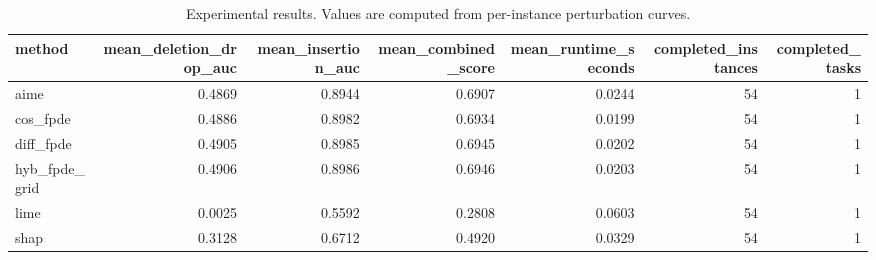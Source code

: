 \begin{table}[t]
\caption{Experimental results. Values are computed from per-instance perturbation curves.}
\label{tab:main_results_computed}
\centering
\begin{tabular}{lrrrrrr}
\toprule
method & mean\_deletion\_drop\_auc & mean\_insertion\_auc & mean\_combined\_score & mean\_runtime\_seconds & completed\_instances & completed\_tasks \\
\midrule
aime & 0.4869 & 0.8944 & 0.6907 & 0.0244 & 54 & 1 \\
cos\_fpde & 0.4886 & 0.8982 & 0.6934 & 0.0199 & 54 & 1 \\
diff\_fpde & 0.4905 & 0.8985 & 0.6945 & 0.0202 & 54 & 1 \\
hyb\_fpde\_grid & 0.4906 & 0.8986 & 0.6946 & 0.0203 & 54 & 1 \\
lime & 0.0025 & 0.5592 & 0.2808 & 0.0603 & 54 & 1 \\
shap & 0.3128 & 0.6712 & 0.4920 & 0.0329 & 54 & 1 \\
\bottomrule
\end{tabular}

\end{table}
